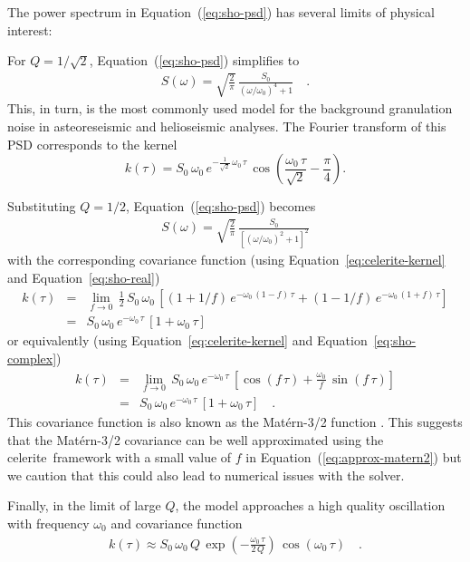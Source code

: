 \documentclass[manuscript, letterpaper]{aastex6}
\newcommand{\project}[1]{\textsf{#1}}
\newcommand{\celerite}{\project{celerite}}
\renewcommand{\eqref}[1]{\ref{eq:#1}}
\newcommand{\Eq}[1]{Equation~(\eqref{#1})}
\newcommand{\eq}[1]{\Eq{#1}}
\newcommand{\eqalt}[1]{Equation~\eqref{#1}}
\newcommand{\eqlabel}[1]{\label{eq:#1}}
\begin{document}
The power spectrum in \eq{sho-psd} has several limits of physical interest:
\begin{itemize}

{\item For $Q = 1/\sqrt{2}$, \eq{sho-psd} simplifies to
\begin{eqnarray}\eqlabel{granulation-psd}
S(\omega) = \sqrt{\frac{2}{\pi}}\,\frac{S_0}{(\omega/\omega_0)^4+1} \quad.
\end{eqnarray}
This, in turn, is the most commonly used model for the background granulation
noise in asteoreseismic \citep{Kallinger:2014} and helioseismic
\citep{Harvey:1985, Michel:2009} analyses.
The Fourier transform of this PSD corresponds to the kernel
\begin{equation}
k(\tau) = S_0\,\omega_0\,e^{-\frac{1}{\sqrt{2}}\,\omega_0\,\tau}\,
    \cos{\left(\frac{\omega_0\,\tau}{\sqrt{2}}-\frac{\pi}{4}\right)}.
\end{equation}}

{\item Substituting $Q = 1/2$, \eq{sho-psd} becomes
\begin{eqnarray}
S(\omega) =
    \sqrt{\frac{2}{\pi}}\,\frac{S_0}{\left[(\omega/\omega_0)^2+1\right]^2}
\end{eqnarray}
with the corresponding covariance function (using
\eqalt{celerite-kernel} and \eqalt{sho-real})
\begin{eqnarray}\eqlabel{approx-matern}
k(\tau) &=& \lim_{f \to 0}\,
    \frac{1}{2}\,S_0\,\omega_0\,
    \left[\left(1+1/f\right)\,e^{-\omega_0\,(1-f)\,\tau} +
          \left(1-1/f\right)\,e^{-\omega_0\,(1+f)\,\tau}
    \right] \\
&=& S_0\,\omega_0\,e^{-\omega_0\,\tau}\,[1+\omega_0\,\tau]
\end{eqnarray}
or equivalently (using \eqalt{celerite-kernel} and \eqalt{sho-complex})
\begin{eqnarray}\eqlabel{approx-matern2}
k(\tau) &=& \lim_{f \to 0}\,
    S_0\,\omega_0\,e^{-\omega_0\,\tau}\,
    \left[\cos(f\,\tau) + \frac{\omega_0}{f}\,\sin(f\,\tau)\right] \\
&=& S_0\,\omega_0\,e^{-\omega_0\,\tau}\,[1+\omega_0\,\tau] \quad.
\end{eqnarray}
This covariance function is also known as the Mat\'ern-3/2 function
\citep{Rasmussen:2006}.
This suggests that the Mat\'ern-3/2 covariance can be well approximated using
the \celerite\ framework with a small value of $f$ in \eq{approx-matern2} but we
caution that this could also lead to numerical issues with the solver.
}

{\item Finally, in the limit of large $Q$, the model approaches a high
    quality oscillation with frequency $\omega_0$ and covariance function
\begin{eqnarray}
k(\tau) \approx
    S_0\,\omega_0\,Q\,
    \exp\left(-\frac{\omega_0\,\tau}{2\,Q}\right)\,
    \cos\left(\omega_0\,\tau\right) \quad.
\end{eqnarray}}

\end{itemize}
\end{document}

